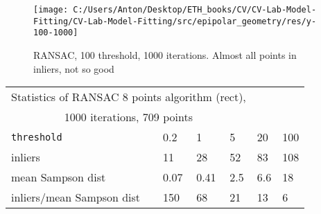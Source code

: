 \documentclass{report}
\begin{document}
\begin{figure}[h!]
	\begin{center}
		\begin{minipage}[h]{0.9\linewidth}
			\texttt{[image: C:/Users/Anton/Desktop/ETH\_books/CV/CV-Lab-Model-Fitting/CV-Lab-Model-Fitting/src/epipolar\_geometry/res/y-100-1000]}
			\caption{RANSAC, 100 threshold, 1000 iterations. Almost all points in inliers, not so good}
		\end{minipage}
	\end{center}
\end{figure}
\begin{center}
	\begin{tabular}{|l|l|l|l|l|l|}
		\multicolumn{4}{c}{Statistics of RANSAC 8 points algorithm (rect),}\\
		\multicolumn{4}{c}{1000 iterations, 709 points }\\
		
		\hline
		\texttt{threshold} &0.2&1 & 5 & 20 & 100 \\
		\hline
		inliers&11&28&52 & 83 &108 \\
		\hline 	
		mean Sampson dist &0.07&0.41&2.5&6.6&18 \\
		\hline
		inliers/mean Sampson dist &150&68& 21& 13 & 6\\ \hline
	\end{tabular}
\end{center}
\end{document}
